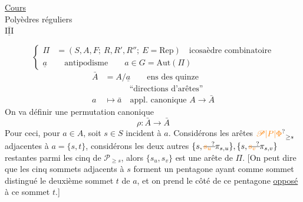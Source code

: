 \begin{flushright}
\uline{Cours}\\
Polyèdres réguliers\\
$\overline{\underline{\mathrm{III}}}$
\end{flushright}
\[
\left\{\begin{aligned}
\Pi&=(S,A,F;\ R,R',R'';\ E=\mathrm{Rep})\quad\text{icosaèdre combinatoire}\\
\underline a&\quad\text{antipodisme}\qquad a\in G=\mathrm{Aut}(\Pi)
\end{aligned}\right.
\]
\[
\begin{aligned}
\bar A&=A/\underline a\qquad\text{ens des quinze}\\
&\hspace{3em}\text{``directions d'arêtes''}\\
a&\longmapsto\bar a\quad\text{appl. canonique }A\longrightarrow\bar A
\end{aligned}
\]
On va définir une permutation canonique
\[
\rho:\bar A\longrightarrow\bar A
\]
Pour ceci, pour $a\in A$, soit $s\in S$ incident à $a$. Considérons les  arêtes   $\unsure{\mathscr P|P|\Phi}_{\geq s}$ adjacentes à $a=\{s,t\}$, considérons les deux autres $\{s,\deleted{\unsure{s_u}}\pi_{s,u}\},\{s,\deleted{\unsure{s_v}}\pi_{s,v}\}$ restantes parmi les cinq de $\mathscr P_{\geq s}$, alors $\{s_u,s_v\}$ est une arête de $\Pi$. [On peut dire que les cinq sommets adjacents à $s$ forment un pentagone ayant comme sommet distingué le deuxième sommet $t$ de $a$, et on prend le côté de ce pentagone \uline{opposé} à ce sommet $t$.]


